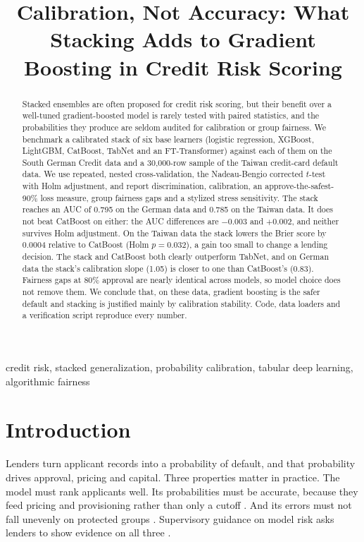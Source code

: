 \documentclass[conference,a4paper]{IEEEtran}
\begin{document}
\title{Calibration, Not Accuracy: What Stacking Adds to Gradient Boosting in Credit Risk Scoring}

\maketitle
\begin{abstract}
Stacked ensembles are often proposed for credit risk scoring, but their benefit over a well-tuned gradient-boosted model is rarely tested with paired statistics, and the probabilities they produce are seldom audited for calibration or group fairness. We benchmark a calibrated stack of six base learners (logistic regression, XGBoost, LightGBM, CatBoost, TabNet and an FT-Transformer) against each of them on the South German Credit data and a 30,000-row sample of the Taiwan credit-card default data. We use repeated, nested cross-validation, the Nadeau-Bengio corrected $t$-test with Holm adjustment, and report discrimination, calibration, an approve-the-safest-90\% loss measure, group fairness gaps and a stylized stress sensitivity. The stack reaches an AUC of 0.795 on the German data and 0.785 on the Taiwan data. It does not beat CatBoost on either: the AUC differences are $-0.003$ and $+0.002$, and neither survives Holm adjustment. On the Taiwan data the stack lowers the Brier score by 0.0004 relative to CatBoost (Holm $p=0.032$), a gain too small to change a lending decision. The stack and CatBoost both clearly outperform TabNet, and on German data the stack's calibration slope (1.05) is closer to one than CatBoost's (0.83). Fairness gaps at 80\% approval are nearly identical across models, so model choice does not remove them. We conclude that, on these data, gradient boosting is the safer default and stacking is justified mainly by calibration stability. Code, data loaders and a verification script reproduce every number.
\end{abstract}
\begin{IEEEkeywords}
credit risk, stacked generalization, probability calibration, tabular deep learning, algorithmic fairness
\end{IEEEkeywords}

\section{Introduction}
Lenders turn applicant records into a probability of default, and that probability drives approval, pricing and capital. Three properties matter in practice. The model must rank applicants well. Its probabilities must be accurate, because they feed pricing and provisioning rather than only a cutoff \cite{vancalster,r28}. And its errors must not fall unevenly on protected groups \cite{hardt,kozodoi}. Supervisory guidance on model risk asks lenders to show evidence on all three \cite{r19,r20}.
\end{document}

